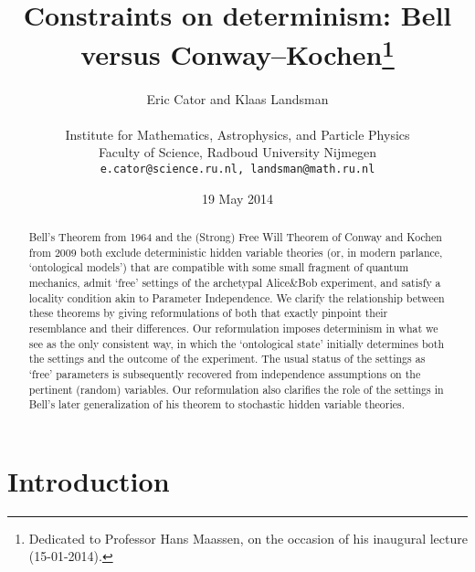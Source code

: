\documentclass[12pt]{article}
\newcommand{\qm}{quantum mechanics}
\begin{document}
 
 \setlength{\unitlength}{1cm}\cleardoublepage
\thispagestyle{empty}
\title{Constraints on determinism: Bell versus Conway--Kochen\footnote{Dedicated to Professor Hans Maassen, on the occasion of his inaugural lecture (15-01-2014).}}
\author{Eric Cator and Klaas Landsman\\ \mbox{} \hfill \\
Institute for Mathematics, Astrophysics, and Particle Physics\\ Faculty of Science, Radboud University Nijmegen\\
\texttt{e.cator@science.ru.nl, landsman@math.ru.nl}}
\date{19 May 2014}
\maketitle

\begin{abstract} 
\noindent 
Bell's Theorem from 1964 and the (Strong) Free Will Theorem of Conway and Kochen from 2009 both exclude deterministic hidden variable theories (or, in modern parlance, `ontological models') 
that are compatible with some small fragment of \qm, admit `free' settings of the archetypal Alice\&Bob experiment, and satisfy a locality condition akin to Parameter Independence. We clarify the relationship between these theorems by giving reformulations 
of both that exactly pinpoint their resemblance and their differences.  Our reformulation imposes  determinism in what we see as the only  consistent way, in which the `ontological state'  initially determines both the settings and the outcome of the experiment. The usual status of the settings as `free' parameters is subsequently  recovered from  independence assumptions on the pertinent (random) variables. Our reformulation also clarifies the role of the settings in 
Bell's later generalization of his theorem to stochastic hidden variable theories.

\end{abstract}
\newpage

\section{Introduction}
\end{document}
